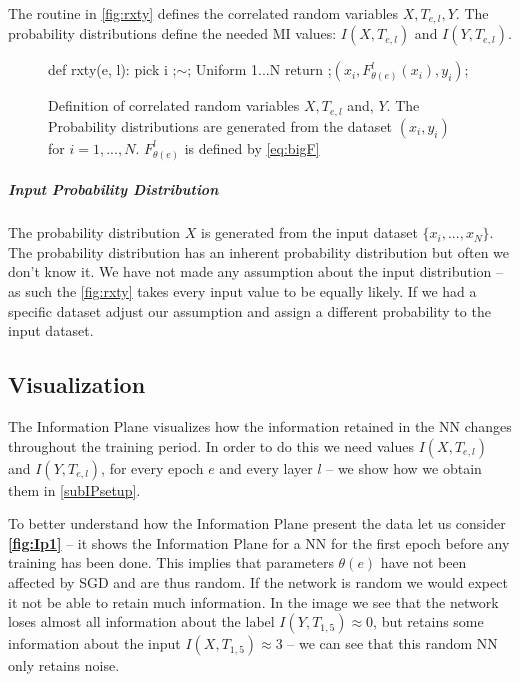 \documentclass[dissertation.tex]{subfiles}
\begin{document}
The routine in \autoref{fig:rxty} defines the correlated random variables
$X,T_{e,l},Y$. The probability distributions define the needed MI values:
$I(X, T_{e,l})$ and $I(Y, T_{e,l})$.

\begin{figure}[H]
    \begin{pythonfigure}
      def rxty(e, l):
        pick i ;$\sim$; Uniform {1...N}
        return ;$(x_i, F_{\theta(e)}^l(x_i), y_i)$;
    \end{pythonfigure}
    \caption{
      Definition of correlated random variables $X, T_{e,l}$ and, $Y$. The
      Probability distributions are generated from the dataset $(x_i, y_i)$ for
      $i = 1,...,N$. $F_{\theta(e)}^l$ is defined by \autoref{eq:bigF}
    }
    \label{fig:rxty}
\end{figure}

\subparagraph{Input Probability Distribution} The probability distribution $X$
is generated from the input dataset $\{x_i,...,x_N\}$. The probability
distribution has an inherent probability distribution but often we don't know
it. We have not made any assumption about the input distribution -- as such the
\autoref{fig:rxty} takes every input value to be equally likely. If we had a
specific dataset adjust our assumption and assign a different probability to the
input dataset.

\subsection{Visualization}

The Information Plane visualizes how the information retained in the NN changes
throughout the training period. 
In order to do this we need values $I(X,T_{e,l})$ and $I(Y,T_{e,l})$, for every
epoch $e$ and every layer $l$ -- we show how we obtain them in
\autoref{subIPsetup}.

To better understand how the Information Plane present the data let us consider
\textbf{\autoref{fig:Ip1}} -- it shows the Information Plane for a NN for the
first epoch before any training has been done. This implies that parameters
$\theta(e)$ have not been affected by SGD and are thus random. If the network is
random we would expect it not be able to retain much information.  In the image
we see that the network loses almost all information about the label $I(Y,
T_{1,5}) \approx 0$, but retains some information about the input $I(X, T_{1,5})
\approx 3$ -- we can see that this random NN only retains noise.
\end{document}
